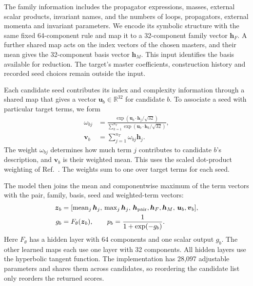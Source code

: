 The family information includes the propagator expressions, masses,
external scalar products, invariant names, and the numbers of loops,
propagators, external momenta and invariant parameters. We encode its
symbolic structure
with the same fixed 64-component rule and map it to a 32-component
family vector $\boldsymbol h_F$. A further shared map acts on the
index vectors of the chosen masters, and their mean gives the
32-component basis vector $\boldsymbol h_M$. This input identifies
the basis available for reduction. The target's master coefficients,
construction history and recorded seed choices remain outside the
input.

Each candidate seed contributes its index and complexity information
through a shared map that gives a vector
$\boldsymbol u_b\in\mathbb R^{32}$ for candidate $b$.
To associate a seed with particular target terms, we form
\begin{equation}
 \begin{aligned}
 \omega_{bj}
 &=\frac{\exp(\boldsymbol u_b\cdot\boldsymbol h_j/\sqrt{32})}
         {\sum_{k=1}^{n_T}
           \exp(\boldsymbol u_b\cdot\boldsymbol h_k/\sqrt{32})},\\
 \boldsymbol v_b&=\sum_{j=1}^{n_T}\omega_{bj}\boldsymbol h_j .
 \end{aligned}
 \label{eq:seed-term-attention}
\end{equation}
The weight $\omega_{bj}$ determines how much term $j$ contributes to
candidate $b$'s description, and $\boldsymbol v_b$ is their weighted
mean. This uses the scaled dot-product weighting of
Ref.~\cite{AttentionIsAllYouNeed}. The weights sum to one over target
terms for each seed.

The model then joins the mean and componentwise maximum of the term
vectors with the pair, family, basis, seed and weighted-term vectors:
\begin{equation}
 \begin{aligned}
 \boldsymbol z_b&=[
   \operatorname{mean}_j\boldsymbol h_j,\,
   \operatorname{max}_j\boldsymbol h_j,\,
   \boldsymbol h_{\rm pair},\boldsymbol h_F,\boldsymbol h_M,\,
   \boldsymbol u_b,\boldsymbol v_b],\\
 g_b&=F_\theta(\boldsymbol z_b),\qquad
 p_b=\frac{1}{1+\exp(-g_b)}.
 \end{aligned}
 \label{eq:seed-probability}
\end{equation}
Here $F_\theta$ has a hidden layer with 64 components and one scalar
output $g_b$. The other learned maps each use one layer with 32
components. All hidden layers use the hyperbolic tangent function.
The implementation has 28,097 adjustable parameters
and shares them across candidates, so reordering the candidate list
only reorders the returned scores.

